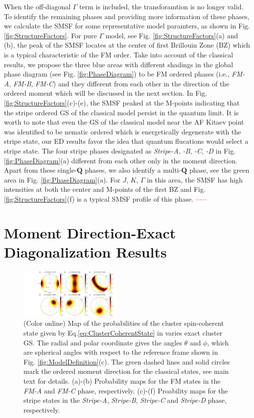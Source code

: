 \documentclass[aps,prb,reprint,amsfonts,amsmath,amssymb,showpacs,groupedaddress,superscriptaddress]{revtex4-1}
\begin{document}
When the off-diagonal $\Gamma$ term is included, the transforamtion is no longer valid. To identify the remaining phases and providing more information of these phases, we calculate the SMSF for some representative model paramters, as shown in Fig. \ref{fig:StructureFactors}. For pure $\Gamma$ model, see Fig. \ref{fig:StructureFactors}(a) and (b), the peak of the SMSF locates at the center of first Brillouin Zone (BZ) which is a typical characteristic of the FM order. Take into account of the classical results, we propose the three blue areas with different shadings in the global phase diagram (see Fig. \ref{fig:PhaseDiagram}) to be FM ordered phases (i.e., \emph{FM-A}, \emph{FM-B}, \emph{FM-C}) and they different from each other in the direction of the ordered moment which will be discussed in the next section. In Fig. \ref{fig:StructureFactors}(c)-(e), the SMSF peaked at the M-points indicating that the stripe ordered GS of the classical model persist in the quantum limit. It is worth to note that even the GS of the classical model near the AF Kitaev point was identified to be nematic ordered which is energetically degenerate with the stripe state, our ED results favor the idea that quantum flucations would select a stripe state. The four stripe phases designated as \emph{Stripe-A}, \emph{-B}, \emph{-C}, \emph{-D} in Fig. \ref{fig:PhaseDiagram}(a) different from each other only in the moment direction. Apart from these single-$\mathbf{Q}$ phases, we also identify a multi-$\mathbf{Q}$ phase, see the green area in Fig. \ref{fig:PhaseDiagram}(a). For $J$, $K$, $\Gamma$ in this area, the SMSF has high intensities at both the center and M-points of the first BZ and Fig. \ref{fig:StructureFactors}(f) is a typical SMSF profile of this phase. \textcolor{red}{$\cdots \cdots$}

\section{Moment Direction-Exact Diagonalization Results}
\begin{figure}
    \includegraphics[width=0.45\textwidth]{Fig4.pdf}
    \caption{\label{fig:Proabilities}(Color online) Map of the probabilities of the cluster spin-coherent state given by Eq.\eqref{eq:ClusterCoherentState} in varies exact cluster GS. The radial and polar coordinate gives the angles $\theta$ and $\phi$, which are spherical angles with respect to the reference frame shown in Fig. \ref{fig:ModelDefinition}(c). The green dashed lines and solid circles mark the ordered moment direction for the classical states, see main text for details. (a)-(b) Probability maps for the FM states in the \emph{FM-A} and \emph{FM-C} phase, respectively. (c)-(f) Proability maps for the stripe states in the \emph{Stripe-A}, \emph{Stripe-B}, \emph{Stripe-C} and \emph{Stripe-D} phase, respectively.}
\end{figure}
\end{document}
